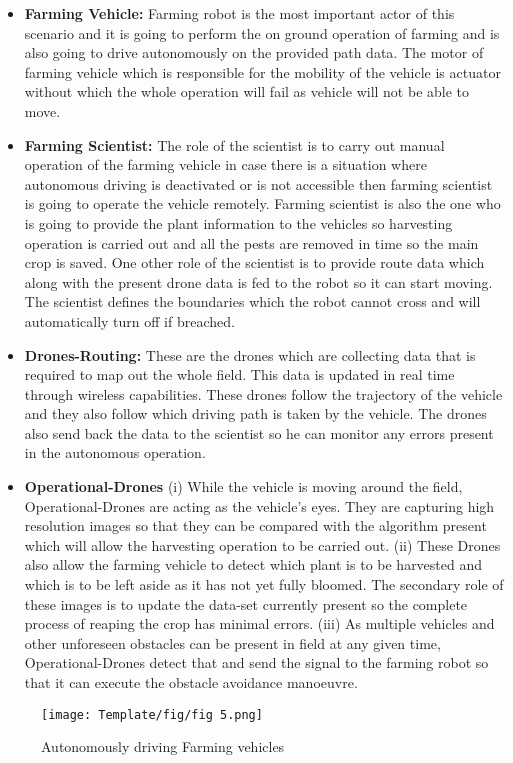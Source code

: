 \documentclass[english]{lni}
\begin{document}
\begin{itemize}
    \item \textbf{Farming Vehicle:} Farming robot is the most important actor of this scenario and it is going to perform the on ground operation of farming and is also going to drive autonomously on the provided path data. The  motor of farming vehicle which is responsible for the mobility of the vehicle is actuator without which the whole operation will fail as vehicle will not be able to move.
    
    \item \textbf{Farming Scientist:} The role of the scientist is to carry out manual operation of the farming vehicle in case there is a situation where autonomous driving is deactivated or is not accessible then farming scientist is going to operate the vehicle remotely. Farming scientist is also the one who is going to provide the plant information to the vehicles so harvesting operation is carried out and all the pests are removed in time so the main crop is saved. One other role of the scientist is to provide route data which along with the present drone data is fed to the robot so it can start moving. The scientist defines the boundaries which the robot cannot cross and will automatically turn off if breached.

    
    \item \textbf{Drones-Routing:} These are the drones which are collecting data that is required to map out the whole field. This data is updated in real time through wireless capabilities. These drones follow the trajectory of the vehicle and they also follow which driving path is taken by the vehicle. The drones also send back the data to the scientist so he can monitor any errors present in the autonomous operation.
    
    \item \textbf{Operational-Drones} (i) While the vehicle is moving around the field, Operational-Drones are acting as the vehicle's eyes. They are capturing high resolution images so that they can be compared with the algorithm present which will allow the harvesting operation to be carried out. (ii) These Drones also allow the farming vehicle to detect which plant is to be harvested and which is to be left aside as it has not yet fully bloomed.  The secondary role of these images is to update the data-set currently present so the complete process of reaping the crop has minimal errors. (iii) As multiple vehicles and other unforeseen obstacles can be present in field at any given time, Operational-Drones detect that and send the signal to the farming robot so that it can execute the obstacle avoidance manoeuvre. 
  
\end{itemize}
\begin{figure}[h]
    \texttt{[image: Template/fig/fig 5.png]}
    \centering
    \caption{Autonomously driving Farming vehicles}
\end{figure}
\end{document}
